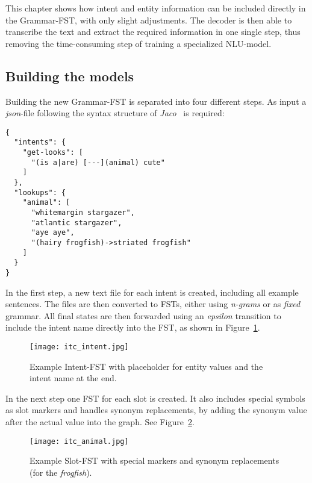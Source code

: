 \documentclass[a4paper]{article}
\begin{document}
This chapter shows how intent and entity information can be included directly in the Grammar-FST, with only slight adjustments. The decoder is then able to transcribe the text and extract the required information in one single step, thus removing the time-consuming step of training a specialized NLU-model. 


\subsection{Building the models}

Building the new Grammar-FST is separated into four different steps. As input a \textit{json}-file following the syntax structure of \textit{Jaco}~\cite{JACO} is required:

\noindent
\begin{minipage}{\linewidth}
\begin{lstlisting}
{
  "intents": {
    "get-looks": [
      "(is a|are) [---](animal) cute"
    ]
  },
  "lookups": {
    "animal": [
      "whitemargin stargazer",
      "atlantic stargazer",
      "aye aye",
      "(hairy frogfish)->striated frogfish"
    ]
  }
}
\end{lstlisting}
\end{minipage}

\vspace{9pt}
In the first step, a new text file for each intent is created, including all example sentences. The files are then converted to FSTs, either using \textit{n-grams} or as \textit{fixed} grammar. All final states are then forwarded using an \textit{epsilon} transition to include the intent name directly into the FST, as shown in Figure~\ref{fig:itc_intent}.

\begin{figure}[H]
	\centering
	\texttt{[image: itc\_intent.jpg]}
	\caption{Example Intent-FST with placeholder for entity values and the intent name at the end.}
	\label{fig:itc_intent}
\end{figure}

In the next step one FST for each slot is created. It also includes special symbols as slot markers and handles synonym replacements, by adding the synonym value after the actual value into the graph. See  Figure~\ref{fig:itc_animal}.

\begin{figure}[H]
	\centering
	\texttt{[image: itc\_animal.jpg]}
	\caption{Example Slot-FST with special markers and synonym replacements (for the \textit{frogfish}).}
	\label{fig:itc_animal}
\end{figure}
\end{document}
